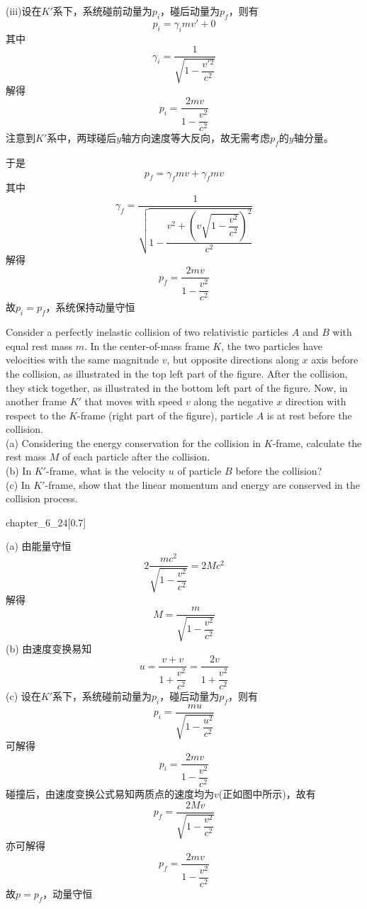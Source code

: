 \begin{solution}
     (iii)设在$K'$系下，系统碰前动量为$p_i$，碰后动量为$p_f$，则有
        \[p_i=\gamma_i mv'+0\]
        其中
        \[\gamma_i = \dfrac{1}{\sqrt{1-\dfrac{v'{}^2}{c^2}}}\]
        解得
        \[p_i=\dfrac{2mv}{1-\dfrac{v^2}{c^2}}\]
        注意到$K'$系中，两球碰后$y$轴方向速度等大反向，故无需考虑$p_f$的$y$轴分量。
        
        于是
        \[p_f=\gamma_f mv +\gamma_f mv\]
        其中
        \[\gamma_f=\dfrac{1}{\sqrt{1-\dfrac{v^2+\left(v\sqrt{1-\dfrac{v^2}{c^2}}\right)^2}{c^2}}}\]
        解得
        \[p_f=\dfrac{2mv}{1-\dfrac{v^2}{c^2}}\]
        故$p_i=p_f$，系统保持动量守恒

\end{solution}

\begin{solution}
	Consider a perfectly inelastic collision of two relativistic particles $A$ and $B$ with equal rest mass $m$. In the center-of-mass frame $K$, the two particles have velocities with the same magnitude $v$, but opposite directions along $x$ axis before the collision, as illustrated in the top left part of the figure. After the collision, they stick together, as illustrated in the bottom left part of the figure. Now, in another frame $K'$ that moves with speed $v$ along the negative $x$ direction with respect to the $K$-frame (right part of the figure), particle $A$ is at rest before the collision.
	\\(a) Considering the energy conservation for the collision in $K$-frame, calculate the
	rest mass $M$ of each particle after the collision.
	\\(b) In $K'$-frame, what is the velocity $u$ of particle $B$ before the collision?
	\\(c) In $K'$-frame, show that the linear momentum and energy are conserved in the collision process.
	\begin{singlefigure}{chapter_6_24}[0.7]    
	\end{singlefigure}
	
	\tcbrule
	
    (a) 由能量守恒
    \[2\frac{mc^2}{\sqrt{1-\dfrac{v^2}{c^2}}}=2Mc^2\]
    解得\[
    	M=\frac{m}{\sqrt{1-\dfrac{v^{2}}{c^{2}}}}
    \]
    (b) 由速度变换易知
    \[u=\frac{v+v}{1+\dfrac{v^{2}}{c^{2}}}=\frac{2v}{1+\dfrac{v^{2}}{c^{2}}}\]
    (c) 设在$K'$系下，系统碰前动量为$p_i$，碰后动量为$p_f$，则有
    \[p_i=\frac{mu}{\sqrt{1-\dfrac{u^{2}}{c^{2}}}}\]
    可解得
    \[p_i=\frac{2mv}{1-\dfrac{v^{2}}{c^{2}}}\]
    碰撞后，由速度变换公式易知两质点的速度均为$v$(正如图中所示)，故有
    \[p_f=\frac{2Mv}{\sqrt{1-\dfrac{v^{2}}{c^{2}}}}\] 
    亦可解得
    \[p_f=\frac{2mv}{1-\dfrac{v^{2}}{c^{2}}}\]
    故$p=p_f$，动量守恒
    

\end{solution}
